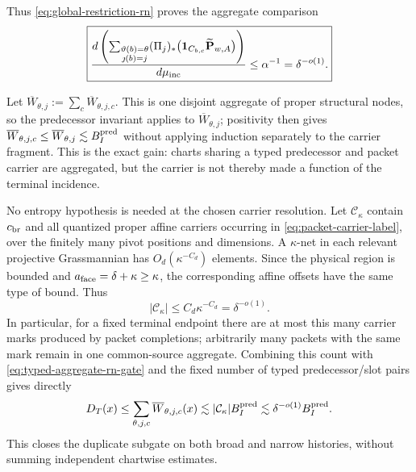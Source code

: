 \documentclass[11pt]{article}
\begin{document}
Thus \eqref{eq:global-restriction-rn} proves the aggregate comparison
\begin{equation}\label{eq:typed-aggregate-rn-gate}
 \boxed{
 \frac{d\left(
   \sum_{\substack{\vartheta(b)=\theta\\\jmath(b)=j}}
   (\Pi_j)_*\bigl({\bf1}_{C_{b,c}}
                  \widetilde{\mathbf P}_{w,A}\bigr)
 \right)}{d\mu_{\rm inc}}
 \le\alpha^{-1}=\delta^{-o(1)}.}
\end{equation}

Let \(\overline W_{\theta,j}:=\sum_c\overline W_{\theta,j,c}\).  This is one
disjoint aggregate of proper structural nodes, so the predecessor invariant
applies to \(\overline W_{\theta,j}\); positivity then gives
\(\overline W_{\theta,j,c}\le\overline W_{\theta,j}\lesssim
B_I^{\rm pred}\) without applying induction separately to the carrier
fragment.  This is the exact gain: charts sharing a typed predecessor and
packet carrier are aggregated, but the carrier is not thereby made a function
of the terminal incidence.

No entropy hypothesis is needed at the chosen carrier resolution.  Let
\(\mathcal C_\kappa\) contain \(c_{\rm br}\) and all quantized proper affine
carriers occurring in \eqref{eq:packet-carrier-label}, over the finitely many
pivot positions and dimensions.  A \(\kappa\)-net in each relevant projective Grassmannian has
\(O_d(\kappa^{-C_d})\) elements.  Since the physical region is bounded and
\(a_{\rm face}=\delta+\kappa\ge\kappa\), the corresponding affine offsets
have the same type of bound.  Thus
\begin{equation}\label{eq:global-coarse-carrier-count}
 \boxed{\lvert\mathcal C_\kappa\rvert
 \le C_d\kappa^{-C_d}=\delta^{-o(1)}.}
\end{equation}
In particular, for a fixed terminal endpoint there are at most this many
carrier marks produced by packet completions; arbitrarily many packets with
the same mark remain in one common-source aggregate.  Combining this count with
\eqref{eq:typed-aggregate-rn-gate} and the fixed number of typed
predecessor/slot pairs gives directly
\begin{equation}\label{eq:carrier-fragment-load-bound}
 D_T(x)
 \le\sum_{\theta,j,c}\overline W_{\theta,j,c}(x)
 \lesssim\lvert\mathcal C_\kappa\rvert B_I^{\rm pred}
 \lesssim\delta^{-o(1)}B_I^{\rm pred}.
\end{equation}
This closes the duplicate subgate on both broad and narrow histories, without
summing independent chartwise estimates.
\end{document}
